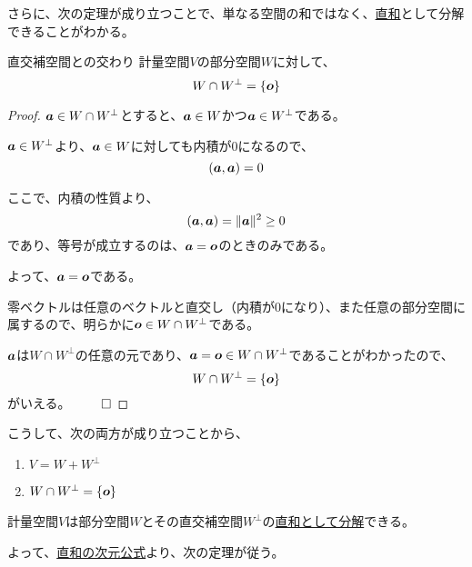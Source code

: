 \documentclass[../../../topic_linear-algebra]{subfiles}
\begin{document}
\br

さらに、次の定理が成り立つことで、単なる空間の和ではなく、\hyperref[def:direct-sum]{直和}として分解できることがわかる。

\begin{theorem*}{直交補空間との交わり}
  計量空間$V$の部分空間$W$に対して、
  \begin{equation*}
    W \cap W^\perp = \{ \vb*{o} \}
  \end{equation*}
\end{theorem*}

\begin{proof}
  $\vb*{a} \in W \cap W^\perp$とすると、$\vb*{a} \in W$かつ$\vb*{a} \in W^\perp$である。

  $\vb*{a} \in W^\perp$より、$\vb*{a} \in W$に対しても内積が0になるので、
  \begin{equation*}
    (\vb*{a}, \vb*{a}) = 0
  \end{equation*}

  ここで、内積の性質より、
  \begin{equation*}
    (\vb*{a}, \vb*{a}) = \| \vb*{a} \|^2 \geq 0
  \end{equation*}
  であり、等号が成立するのは、$\vb*{a} = \vb*{o}$のときのみである。

  よって、$\vb*{a} = \vb*{o}$である。

  \br

  零ベクトルは任意のベクトルと直交し（内積が0になり）、また任意の部分空間に属するので、明らかに$\vb*{o} \in W \cap W^\perp$である。

  \br

  $\vb*{a}$は$W \cap W^\perp$の任意の元であり、$\vb*{a} = \vb*{o} \in W \cap W^\perp$であることがわかったので、
  \begin{equation*}
    W \cap W^\perp = \{ \vb*{o} \}
  \end{equation*}
  がいえる。 $\qed$
\end{proof}

\br

こうして、次の両方が成り立つことから、
\begin{enumerate}[label=\romanlabel]
  \item $V = W + W^\perp$
  \item $W \cap W^\perp = \{ \vb*{o} \}$
\end{enumerate}
計量空間$V$は部分空間$W$とその直交補空間$W^\perp$の\hyperref[thm:direct-sum-equiv]{直和として分解}できる。

\br

よって、\hyperref[thm:dim-direct-sum]{直和の次元公式}より、次の定理が従う。
\end{document}
